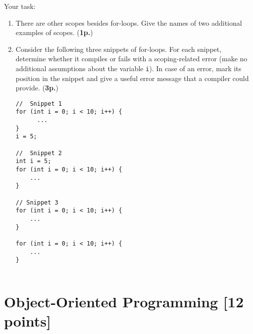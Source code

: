 \documentclass{article}
\begin{document}
\begin{enumerate}
Your task:
\begin{enumerate}
\item There are other scopes besides for-loops. Give the names of two
additional examples of scopes. 
(\textbf{1p.})
\item Consider the following three snippets of for-loops. For each snippet, 
determine whether it compiles or fails with a scoping-related error
(make no additional assumptions about the variable \texttt{i}). In case
of an error, mark its position in the snippet and give a useful error message
that a compiler could provide. (\textbf{3p.})
{\small
\begin{verbatim}
//  Snippet 1
for (int i = 0; i < 10; i++) {
      ... 
}
i = 5;      

//  Snippet 2 
int i = 5;
for (int i = 0; i < 10; i++) {   
    ...
}
    
// Snippet 3
for (int i = 0; i < 10; i++) {
    ...
}

for (int i = 0; i < 10; i++) { 
    ...
}
    
\end{verbatim}
}


\end{enumerate}
\end{enumerate}

\newpage
\section{Object-Oriented Programming [12 points]}
\end{document}
